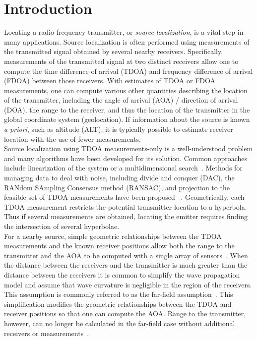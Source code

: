 \section{Introduction}
\label{s:intro}
Locating a radio-frequency transmitter, or \emph{source localization}, is a vital step in many applications. Source localization is often performed using measurements of the transmitted signal obtained by several nearby receivers. Specifically, measurements of the transmitted signal at two distinct receivers allow one to compute the time difference of arrival (TDOA) and frequency difference of arrival (FDOA) between those receivers. With estimates of TDOA or FDOA measurements, one can compute various other quantities describing the location of the transmitter, including the angle of arrival (AOA) / direction of arrival (DOA), the range to the receiver, and thus the location of the transmitter in the global coordinate system (geolocation). If information about the source is known {\em a priori}, such as altitude (ALT), it is typically possible to estimate receiver location with the use of fewer measurements. \\

Source localization using TDOA measurements-only is a well-understood problem and many algorithms have been developed for its solution. Common approaches include linearization of the system or a multidimensional search~\cite{Torrieri1984}. Methods for managing data to deal with noise, including divide and conquer (DAC), the RANdom SAmpling Consensus method (RANSAC), and projection to the feasible set of TDOA measurements have been proposed ~\cite{Cameron,Abel1990,Li2009,Compagnoni2017}. Geometrically, each TDOA measurement restricts the potential transmitter location to a hyperbola. Thus if several measurements are obtained, locating the emitter requires finding the intersection of several hyperbolae. \\

For a nearby source, simple geometric relationships between the TDOA measurements and the known receiver positions allow both the range to the transmitter and the AOA to be computed with a single array of sensors~\cite{Benesty2008}. When the distance between the receivers and the transmitter is much greater than the distance between the receivers it is common to simplify the wave propagation model and assume that wave curvature is negligible in the region of the receivers. This assumption is commonly referred to as the far-field assumption~\cite{Cheney2009}. This simplification modifies the geometric relationships between the TDOA and receiver positions so that one can compute the AOA. Range to the transmitter, however, can no longer be calculated in the far-field case without additional receivers or measurements~\cite{Benesty2008}. \\

